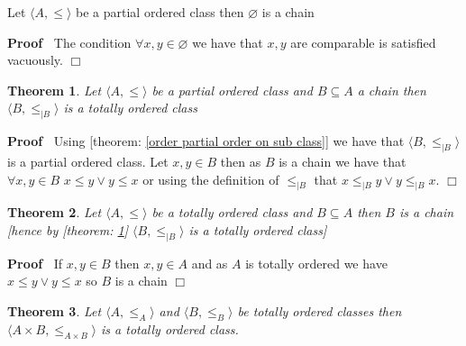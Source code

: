 \documentclass{book}
\newenvironment{proof}{\noindent\textbf{Proof\ }}{\hspace*{\fill}$\Box$\medskip}
\newtheorem{theorem}{Theorem}
\begin{document}
\begin{example}
  \label{order empty set is a chain}Let $\langle A, \leqslant \rangle$ be a
  partial ordered class then $\varnothing$ is a chain
\end{example}

\begin{proof}
  The condition $\forall x, y \in \varnothing$ we have that $x, y$ are
  comparable is satisfied vacuously.
\end{proof}

\begin{theorem}
  \label{order chain is a totally ordered class}Let $\langle A, \leqslant
  \rangle$ be a partial ordered class and $B \subseteq A$ a chain then
  $\langle B, \leqslant_{|B} \rangle$ is a totally ordered class
\end{theorem}

\begin{proof}
  Using [theorem: \ref{order partial order on sub class}] we have that
  $\langle B, \leqslant_{|B} \rangle$ is a partial ordered class. Let $x, y
  \in B$ then as $B$ is a chain we have that $\forall x, y \in B$ $x \leqslant
  y \vee y \leqslant x$ or using the definition of $\leqslant_{|B}$ that $x
  \leqslant_{|B} y \vee y \leqslant_{|B} x$.
\end{proof}

\begin{theorem}
  \label{order totally ordered subclass}Let $\langle A, \leqslant \rangle$ be
  a totally ordered class and $B \subseteq A$ then $B$ is a chain [hence by
  [theorem: \ref{order chain is a totally ordered class}] $\langle B,
  \leqslant_{|B} \rangle$ is a totally ordered class]
\end{theorem}

\begin{proof}
  If $x, y \in B$ then $x, y \in A$ and as $A$ is totally ordered we have $x
  \leqslant y \vee y \leqslant x$ so $B$ is a chain
\end{proof}

\begin{theorem}
  \label{order totally lexicol ordering}Let $\langle A, \leqslant_A \rangle$
  and $\langle B, \leqslant_B \rangle$ be totally ordered classes then
  $\langle A \times B, \leqslant_{A \times B} \rangle$ is a totally ordered
  class.
\end{theorem}
\end{document}
